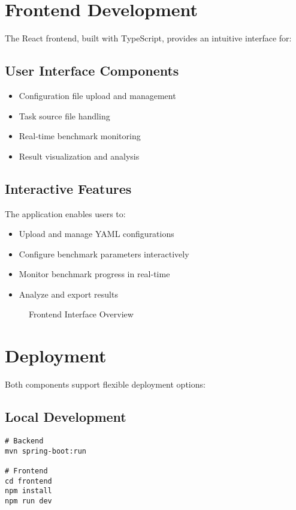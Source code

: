 \section{Frontend Development}

The React frontend, built with TypeScript, provides an intuitive interface for:

\subsection{User Interface Components}
\begin{itemize}
    \item Configuration file upload and management
    \item Task source file handling
    \item Real-time benchmark monitoring
    \item Result visualization and analysis
\end{itemize}

\subsection{Interactive Features}
The application enables users to:
\begin{itemize}
    \item Upload and manage YAML configurations
    \item Configure benchmark parameters interactively
    \item Monitor benchmark progress in real-time
    \item Analyze and export results
\end{itemize}

\begin{figure}[h]
    \centering
    \caption{Frontend Interface Overview}
    \label{fig:frontend-ui}
\end{figure}

\section{Deployment}

Both components support flexible deployment options:

\subsection{Local Development}
\begin{verbatim}
# Backend
mvn spring-boot:run

# Frontend
cd frontend
npm install
npm run dev
\end{verbatim}

